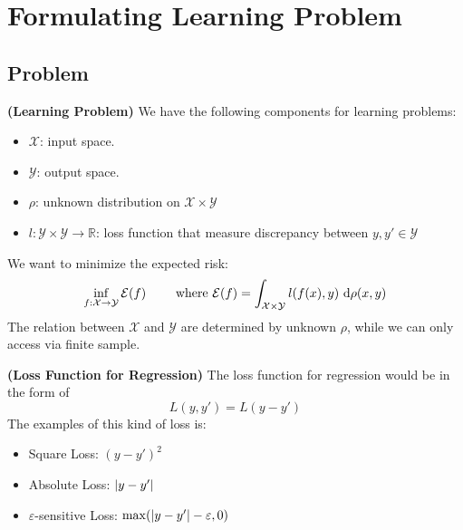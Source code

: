 \section{Formulating Learning Problem}

\subsection{Problem}

\begin{definition}{\textbf{(Learning Problem)}}
    We have the following components for learning problems:
    \begin{itemize}
        \item $\mathcal{X}$: input space. 
        \item $\mathcal{Y}$: output space. 
        \item $\rho$: unknown distribution on $\mathcal{X}\times\mathcal{Y}$
        \item $l : \mathcal{Y}\times\mathcal{Y}\rightarrow \mathbb{R}$: loss function that measure discrepancy between $y,y'\in\mathcal{Y}$
    \end{itemize}
    We want to minimize the expected risk:
    \begin{equation*}
        \inf_{f:\mathcal{X}\rightarrow\mathcal{Y}}\mathcal{E}(f) \qquad \text{ where } \mathcal{E}(f) = \int_{\mathcal{X}\times\mathcal{Y}} l(f(x), y)\ \mathrm{d}\rho(x, y)
    \end{equation*}
    The relation between $ \mathcal{X} $ and $\mathcal{Y}$ are determined by unknown $\rho$, while we can only access via finite sample. 
\end{definition}

\begin{remark}{\textbf{(Loss Function for Regression)}}
    The loss function for regression would be in the form of 
    \begin{equation*}
        L(y, y') = L(y-y')
    \end{equation*}
    The examples of this kind of loss is:
    \begin{itemize}
        \item Square Loss: $(y-y')^2$
        \item Absolute Loss: $\left| y-y' \right|$
        \item $\varepsilon$-sensitive Loss: $\max(\left| y-y' \right|-\varepsilon, 0)$
    \end{itemize}
\end{remark}

